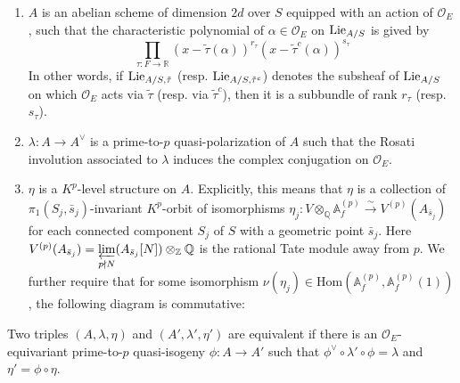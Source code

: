 \documentclass{article}
\begin{document}
\begin{enumerate}
	\item $A$ is an abelian scheme of dimension $2d$ over $S$ equipped with an action of $\mathcal{O}_E$, such that the characteristic polynomial of $\alpha\in\mathcal{O}_E$ on $\textnormal{Lie}_{A/S}$ is gived by
		\begin{equation}
			\prod_{\tau:F\to\mathbb{R}}(x-\tilde{\tau}(\alpha))^{r_\tau}(x-\tilde{\tau}^c(\alpha))^{s_\tau}
		\end{equation}
In other words, if $\textnormal{Lie}_{A/S,\tilde\tau}$ (resp. $\textnormal{Lie}_{A/S,\tilde\tau^c}$) denotes the subsheaf of $\textnormal{Lie}_{A/S}$ on which $\mathcal{O}_E$ acts via $\tilde\tau$ (resp. via $\tilde\tau^c$), then it is a subbundle of rank $r_\tau$ (resp. $s_\tau$).
	\item $\lambda:A\to A^\vee$ is a prime-to-$p$ quasi-polarization of $A$ such that the Rosati involution associated to $\lambda$ induces the complex conjugation on $\mathcal{O}_E$.
	\item $\eta$ is a $K^p$-level structure on $A$. Explicitly, this means that $\eta$ is a collection of $\pi_1(S_j,\bar{s}_j)$-invariant $K^p$-orbit of isomorphisms $\eta_j:V\otimes_\mathbb{Q}\mathbb{A}^{(p)}_f\stackrel{\sim}{\longrightarrow}V^{(p)}(A_{\bar{s}_j})$ for each connected component $S_j$ of $S$ with a geometric point $\bar{s}_j$. Here $V^{(p)}(A_{\bar{s}_j})= \varprojlim\limits_{p\nmid N}(A_{\bar{s}_j}[N])\otimes_\mathbb{Z}\mathbb{Q}$ is the rational Tate module away from $p$. We further require that for some isomorphism $\nu(\eta_j)\in \text{Hom}({\mathbb{A}}_f^{(p)},{\mathbb{A}}_f^{(p)}(1))$, the following diagram is commutative:

\end{enumerate}
Two triples $(A,\lambda,\eta)$ and $(A',\lambda',\eta')$ are equivalent if there is an $\mathcal{O}_E$-equivariant prime-to-$p$ quasi-isogeny $\phi:A\to A'$ such that $\phi^\vee\circ\lambda'\circ\phi=\lambda$ and $\eta'=\phi\circ \eta$.
\end{document}
